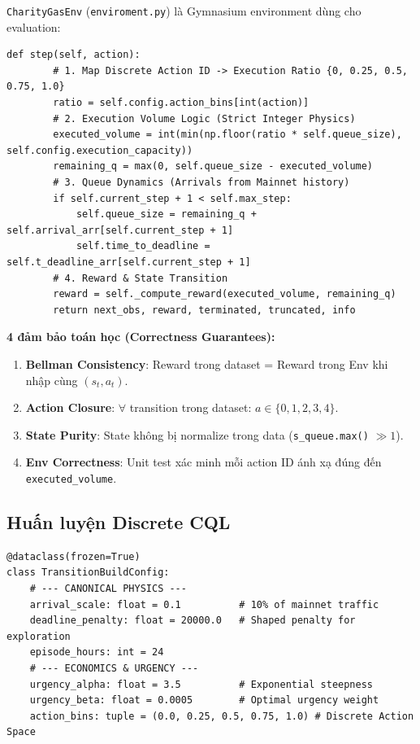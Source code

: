 \texttt{CharityGasEnv} (\texttt{enviroment.py}) là Gymnasium environment dùng cho evaluation:

\begin{lstlisting}[style=PythonStyle, caption={Cài đặt môi trường Discrete (Source: enviroment.py)}]
    def step(self, action):
        # 1. Map Discrete Action ID -> Execution Ratio {0, 0.25, 0.5, 0.75, 1.0}
        ratio = self.config.action_bins[int(action)]
        # 2. Execution Volume Logic (Strict Integer Physics)
        executed_volume = int(min(np.floor(ratio * self.queue_size), self.config.execution_capacity))
        remaining_q = max(0, self.queue_size - executed_volume)
        # 3. Queue Dynamics (Arrivals from Mainnet history)
        if self.current_step + 1 < self.max_step:
            self.queue_size = remaining_q + self.arrival_arr[self.current_step + 1]
            self.time_to_deadline = self.t_deadline_arr[self.current_step + 1]
        # 4. Reward & State Transition
        reward = self._compute_reward(executed_volume, remaining_q)
        return next_obs, reward, terminated, truncated, info
\end{lstlisting}

\textbf{4 đảm bảo toán học (Correctness Guarantees):}
\begin{enumerate}
    \item \textbf{Bellman Consistency}: Reward trong dataset = Reward trong Env khi nhập cùng $(s_t, a_t)$.
    \item \textbf{Action Closure}: $\forall$ transition trong dataset: $a \in \{0,1,2,3,4\}$.
    \item \textbf{State Purity}: State không bị normalize trong data (\texttt{s\_queue.max()} $\gg 1$).
    \item \textbf{Env Correctness}: Unit test xác minh mỗi action ID ánh xạ đúng đến \texttt{executed\_volume}.
\end{enumerate}

\subsection{Huấn luyện Discrete CQL}

\begin{lstlisting}[style=PythonStyle, caption={Certified Optimal Configuration (Source: config.py)}]
@dataclass(frozen=True)
class TransitionBuildConfig:
    # --- CANONICAL PHYSICS ---
    arrival_scale: float = 0.1          # 10% of mainnet traffic
    deadline_penalty: float = 20000.0   # Shaped penalty for exploration
    episode_hours: int = 24             
    # --- ECONOMICS & URGENCY ---
    urgency_alpha: float = 3.5          # Exponential steepness
    urgency_beta: float = 0.0005        # Optimal urgency weight
    action_bins: tuple = (0.0, 0.25, 0.5, 0.75, 1.0) # Discrete Action Space
\end{lstlisting}

